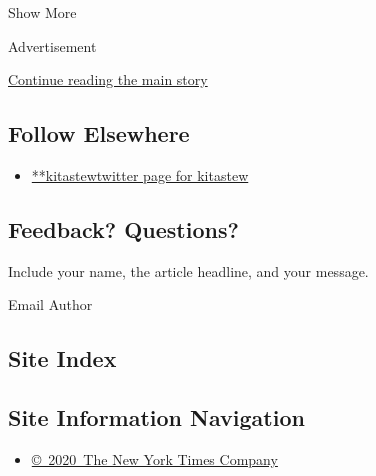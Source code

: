 Show More

Advertisement

\protect\hyperlink{after-mid2}{Continue reading the main story}

\hypertarget{follow-elsewhere}{%
\subsection{Follow Elsewhere}\label{follow-elsewhere}}

\begin{itemize}
\tightlist
\item
  \href{https://twitter.com/kitastew}{**kitastewtwitter page for
  kitastew}
\end{itemize}

\hypertarget{feedback-questions}{%
\subsection{Feedback? Questions?}\label{feedback-questions}}

Include your name, the article headline, and your message.

Email Author

\hypertarget{site-index}{%
\subsection{Site Index}\label{site-index}}

\hypertarget{site-information-navigation}{%
\subsection{Site Information
Navigation}\label{site-information-navigation}}

\begin{itemize}
\tightlist
\item
  \href{https://help.nytimes3xbfgragh.onion/hc/en-us/articles/115014792127-Copyright-notice}{©~2020~The
  New York Times Company}
\end{itemize}

